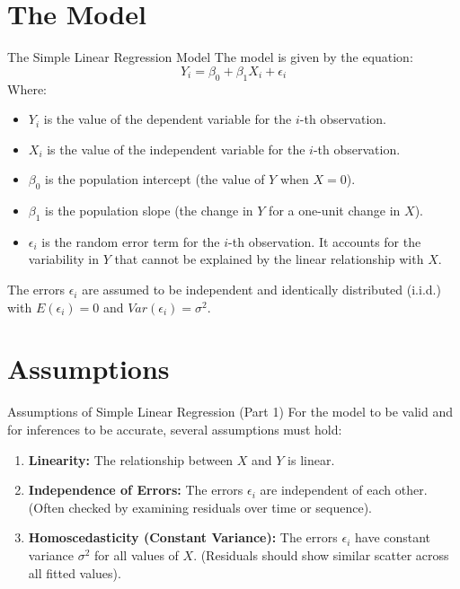 \documentclass[aspectratio=169]{beamer}
\begin{document}
\section{The Model}
\begin{frame}{The Simple Linear Regression Model}
  The model is given by the equation:
  \begin{equation*}
    Y_i = \beta_0 + \beta_1 X_i + \epsilon_i
  \end{equation*}
  Where:
  \begin{itemize}
    \item $Y_i$ is the value of the dependent variable for the $i$-th observation.
    \item $X_i$ is the value of the independent variable for the $i$-th observation.
    \item $\beta_0$ is the population intercept (the value of $Y$ when $X=0$).
    \item $\beta_1$ is the population slope (the change in $Y$ for a one-unit change in $X$).
    \item $\epsilon_i$ is the random error term for the $i$-th observation. It accounts for the variability in $Y$ that cannot be explained by the linear relationship with $X$.
  \end{itemize}
  The errors $\epsilon_i$ are assumed to be independent and identically distributed (i.i.d.) with $E(\epsilon_i) = 0$ and $Var(\epsilon_i) = \sigma^2$.
\end{frame}

\section{Assumptions}
\begin{frame}{Assumptions of Simple Linear Regression (Part 1)}
  For the model to be valid and for inferences to be accurate, several assumptions must hold:
  \begin{enumerate}
    \item \textbf{Linearity:} The relationship between $X$ and $Y$ is linear.
    \item \textbf{Independence of Errors:} The errors $\epsilon_i$ are independent of each other. (Often checked by examining residuals over time or sequence).
    \item \textbf{Homoscedasticity (Constant Variance):} The errors $\epsilon_i$ have constant variance $\sigma^2$ for all values of $X$. (Residuals should show similar scatter across all fitted values).
  \end{enumerate}
\end{frame}
\end{document}

